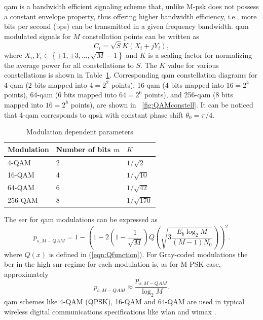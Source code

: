 %
\gls{qam} is a bandwidth efficient signaling scheme that, unlike M-\gls{psk} does not possess a
constant envelope property, thus offering higher bandwidth efficiency, i.e., more bits per second (bps) can be transmitted in a given frequency bandwidth. \gls{qam} modulated signals for $M$ constellation points can be written as
%
\begin{equation*}
C_i=\sqrt{S}K(X_i + jY_i),
\end{equation*}
%
where $X_i, Y_i \in \left\lbrace\pm 1, \pm 3,\ldots,\sqrt{M}-1 \right\rbrace$ and $K$ is a scaling factor for normalizing the average power for all constellations to $S$. The $K$ value for various constellations is shown in Table~\ref{tab:param}. Corresponding \gls{qam} constellation diagrams for 4-\gls{qam} ($2$ bits mapped into $4=2^2$ points), 16-\gls{qam} ($4$ bits mapped into $16=2^4$ points), 64-\gls{qam} ($6$ bits mapped into $64=2^6$ points), and 256-\gls{qam} ($8$ bits mapped into $16=2^8$ points), are shown in ~\cref{fig:QAMconstell}. It can be noticed that 4-\gls{qam} corresponds to \gls{qpsk} with constant phase shift $\theta_0 =\pi/4$.
%
\begin{table}[htb]
\centering
\scriptsize
\renewcommand\arraystretch{1.6}
\begin{tabular}{ p{3cm} p{3cm} p{3cm}}\toprule
Modulation&Number of bits $m$&$K$\\\midrule
4-QAM&2&$1/\sqrt{2}$\\
16-QAM&4&$1/\sqrt{10}$\\
64-QAM&6&$1/\sqrt{42}$\\
256-QAM&8&$1/\sqrt{170}$\\\bottomrule
\end{tabular}
\caption{Modulation dependent parameters}\label{tab:param}
\end{table}
%
The \gls{ser} for \gls{qam} modulations can be expressed as
%
\begin{equation*}
p_{s,M-QAM} = 1-\left( 1-2\left( 1-\frac{1}{\sqrt{M}}\right)Q\left( \sqrt{3\frac{E_b\log_2 M}{(M-1)N_0}}\right) \right) ^2.
\end{equation*}
%
where $Q(x)$ is defined in (\ref{eqn:Qfunction}). For Gray-coded modulations  the \gls{ber} in the high \gls{snr} regime for each modulation is, as for M-PSK case, approximately
\begin{equation}
\label{eqn:MQAMmodBER}
p_{b,M-QAM} \approx \frac{p_{s,M-QAM}}{\log_2M}.
\end{equation}
\Gls{qam} schemes like 4-QAM (QPSK), 16-QAM and 64-QAM are used in typical wireless digital communications specifications like \gls{wlan} and \gls{wimax} \cite{WiMAXLTE}.
